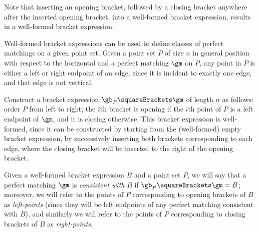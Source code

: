 \documentclass[10pt, a4paper, twoside]{basestyle}
\begin{document}
Note that inserting an opening bracket, followed by a closing bracket anywhere after the
inserted opening bracket, into a well-formed bracket expression, results in a well-formed bracket
expression.

Well-formed bracket expressions can be used to define classes of perfect matchings on a given point set.
Given a point set $P$  of size $n$ in general position with respect to the horizontal and a perfect
matching $\gm$ on $P$, any point in $P$ is either a left or right endpoint of an edge, since it
is incident to exactly one edge, and that edge is not vertical.

Construct a bracket expression $\gb_P\of\gm$ of length $n$ as follows: order $P$ from left to right;
the $i$th bracket is opening if the $i$th point of $P$ is a left endpoint of $\gm$, and it is
closing otherwise.
This bracket expression is well-formed, since it can be constructed by starting from the
(well-formed) empty bracket expression, by successively inserting both brackets corresponding to
each edge, where the closing bracket will be inserted to the right of the opening bracket.

Given a well-formed bracket expression $B$ and a point set $P$, we will say that a perfect matching
$\gm$ is \emph{consistent with} $B$ if $\gb_P\of\gm = B$; moreover, we will refer to the points of
$P$ corresponding to opening brackets of $B$ as \emph{left-points} (since they will be left endpoints
of any perfect matching consistent with $B$), and similarly we will refer to the points of $P$
corresponding to closing brackets of $B$ as \emph{right-points}.
\end{document}
